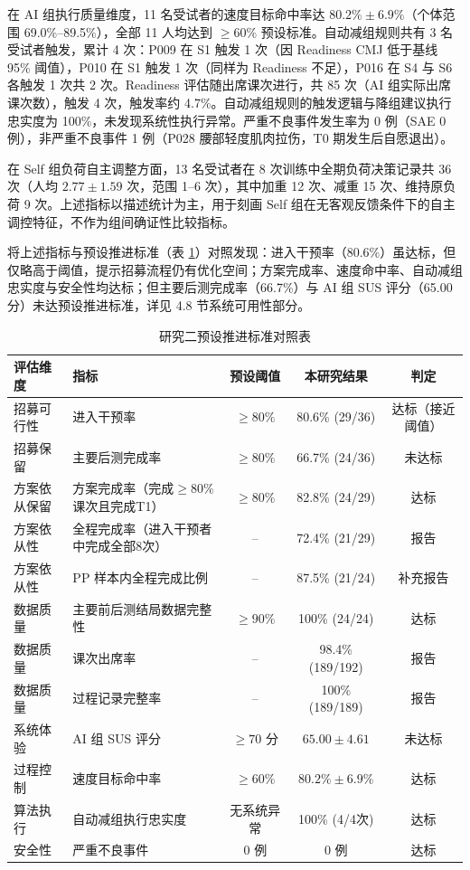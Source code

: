 \documentclass[UTF8,zihao=-4,twoside,openany]{ctexbook}
\begin{document}
在 AI 组执行质量维度，11 名受试者的速度目标命中率达 $80.2\% \pm 6.9\%$（个体范围 69.0\%--89.5\%），全部 11 人均达到 $\ge$60\% 预设标准。自动减组规则共有 3 名受试者触发，累计 4 次：P009 在 S1 触发 1 次（因 Readiness CMJ 低于基线 95\% 阈值），P010 在 S1 触发 1 次（同样为 Readiness 不足），P016 在 S4 与 S6 各触发 1 次共 2 次。Readiness 评估随出席课次进行，共 85 次（AI 组实际出席课次数），触发 4 次，触发率约 4.7\%。自动减组规则的触发逻辑与降组建议执行忠实度为 100\%，未发现系统性执行异常。严重不良事件发生率为 0 例（SAE 0 例），非严重不良事件 1 例（P028 腰部轻度肌肉拉伤，T0 期发生后自愿退出）。

在 Self 组负荷自主调整方面，13 名受试者在 8 次训练中全期负荷决策记录共 36 次（人均 $2.77 \pm 1.59$ 次，范围 1--6 次），其中加重 12 次、减重 15 次、维持原负荷 9 次。上述指标以描述统计为主，用于刻画 Self 组在无客观反馈条件下的自主调控特征，不作为组间确证性比较指标。

将上述指标与预设推进标准（表 \ref{tab:ch4-feasibility}）对照发现：进入干预率（80.6\%）虽达标，但仅略高于阈值，提示招募流程仍有优化空间；方案完成率、速度命中率、自动减组忠实度与安全性均达标；但主要后测完成率（66.7\%）与 AI 组 SUS 评分（65.00 分）未达预设推进标准，详见 4.8 节系统可用性部分。

\begin{table}[htbp]
  \centering
  \caption{研究二预设推进标准对照表}
  \label{tab:ch4-feasibility}
  \vspace{6pt}
  \small
  \begin{tabularx}{\textwidth}{|m{2.8cm}|m{4.8cm}|c|c|c|}
    \hline
    \textbf{评估维度} & \textbf{指标} & \textbf{预设阈值} & \textbf{本研究结果} & \textbf{判定} \\ \hline
    招募可行性 & 进入干预率 & $\ge 80\%$ & 80.6\% (29/36) & 达标（接近阈值） \\ \hline
    招募保留 & 主要后测完成率 & $\ge 80\%$ & 66.7\% (24/36) & 未达标 \\ \hline
    方案依从保留 & 方案完成率（完成$\ge 80\%$课次且完成T1） & $\ge 80\%$ & 82.8\% (24/29) & 达标 \\ \hline
    方案依从性 & 全程完成率（进入干预者中完成全部8次） & -- & 72.4\% (21/29) & 报告 \\ \hline
    方案依从性 & PP 样本内全程完成比例 & -- & 87.5\% (21/24) & 补充报告 \\ \hline
    数据质量 & 主要前后测结局数据完整性 & $\ge 90\%$ & 100\% (24/24) & 达标 \\ \hline
    数据质量 & 课次出席率 & -- & 98.4\% (189/192) & 报告 \\ \hline
    数据质量 & 过程记录完整率 & -- & 100\% (189/189) & 报告 \\ \hline
    系统体验 & AI 组 SUS 评分 & $\ge 70$ 分 & $65.00 \pm 4.61$ & 未达标 \\ \hline
    过程控制 & 速度目标命中率 & $\ge 60\%$ & $80.2\% \pm 6.9\%$ & 达标 \\ \hline
    算法执行 & 自动减组执行忠实度 & 无系统异常 & 100\% (4/4次) & 达标 \\ \hline
    安全性 & 严重不良事件 & 0 例 & 0 例 & 达标 \\ \hline
  \end{tabularx}
\end{table}
\end{document}

